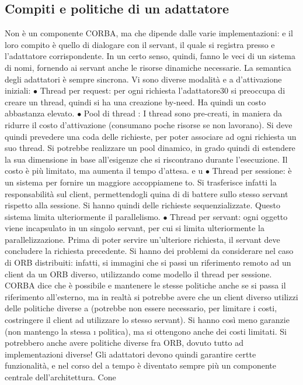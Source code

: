 \subsection{Compiti e politiche di un adattatore}
Non è un componente CORBA, ma che dipende dalle varie implementazioni:
e
il loro compito è quello di dialogare con il servant, il quale si registra presso
e
l'adattatore corrispondente. In un certo senso, quindi, fanno le veci di un sistema
di nomi, fornendo ai servant anche le risorse dinamiche necessarie.
La semantica degli adattatori è sempre sincrona. Vi sono diverse modalità
e
a
d'attivazione iniziali:
$\bullet$ Thread per request: per ogni richiesta l'adattatore30 si preoccupa di creare
un thread, quindi si ha una creazione by-need. Ha quindi un costo abbastanza elevato.
$\bullet$ Pool di thread : I thread sono pre-creati, in maniera da ridurre il costo
d'attivazione (consumano poche risorse se non lavorano). Si deve quindi
prevedere una coda delle richieste, per poter associare ad ogni richiesta un
suo thread.
Si potrebbe realizzare un pool dinamico, in grado quindi di estendere la
sua dimensione in base all'esigenze che si riscontrano durante l'esecuzione.
Il costo è più limitato, ma aumenta il tempo d'attesa.
e u
$\bullet$ Thread per sessione: è un sistema per fornire un maggiore accoppiamene
to. Si trasferisce infatti la responsabilità sul client, permettendogli quina
di di battere sullo stesso servant rispetto alla sessione. Si hanno quindi delle richieste sequenzializzate. Questo
sistema limita ulteriormente il
parallelismo.
$\bullet$ Thread per servant: ogni oggetto viene incapsulato in un singolo servant,
per cui si limita ulteriormente la parallelizzazione. Prima di poter servire
un'ulteriore richiesta, il servant deve concludere la richiesta precedente.
Si hanno dei problemi da considerare nel caso di ORB distribuiti: infatti, si
immagini che si passi un riferimento remoto ad un client da un ORB diverso,
utilizzando come modello il thread per sessione. CORBA dice che è possibile
e
mantenere le stesse politiche anche se si passa il riferimento all'esterno, ma
in realtà si potrebbe avere che un client diverso utilizzi delle politiche diverse
a
(potrebbe non essere necessario, per limitare i costi, costringere il client ad utilizzare lo stesso servant). Si hanno
così meno garanzie (non mantengo la stessa
\i{}
politica), ma si ottengono anche dei costi limitati. Si potrebbero anche avere
politiche diverse fra ORB, dovuto tutto ad implementazioni diverse!
Gli adattatori devono quindi garantire certte funzionalità, e nel corso del
a
tempo è diventato sempre più un componente centrale dell'architettura. Cone
